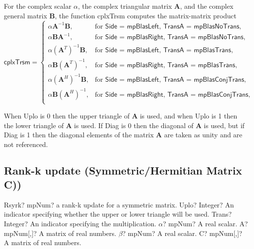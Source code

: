 \vspace{0.3cm}
For the complex scalar $\alpha$, the complex triangular matrix $\boldsymbol{A}$, and  the complex general matrix $\boldsymbol{B}$, the function \textsf{cplxTrsm} computes the matrix-matrix product
\begin{equation}
\textsf{cplxTrsm}=\begin{cases}
\alpha \boldsymbol{A}^{-1} \boldsymbol{B}, & \text{for } \textsf{Side = mpBlasLeft, TransA = mpBlasNoTrans},\\
\alpha \boldsymbol{B} \boldsymbol{A}^{-1}, & \text{for } \textsf{Side = mpBlasRight, TransA = mpBlasNoTrans},\\
\alpha \left(\boldsymbol{A}^T \right)^{-1} \boldsymbol{B}, & \text{for } \textsf{Side = mpBlasLeft, TransA = mpBlasTrans},\\
\alpha \boldsymbol{B} \left(\boldsymbol{A}^T \right)^{-1}, & \text{for } \textsf{Side = mpBlasRight, TransA = mpBlasTrans},\\
\alpha \left(\boldsymbol{A}^H \right)^{-1} \boldsymbol{B}, & \text{for } \textsf{Side = mpBlasLeft, TransA = mpBlasConjTrans},\\
\alpha \boldsymbol{B} \left(\boldsymbol{A}^H \right)^{-1}, & \text{for } \textsf{Side = mpBlasRight, TransA = mpBlasConjTrans},\\
\end{cases}
\end{equation}

When \textsf{Uplo} is 0 then the upper triangle of $\boldsymbol{A}$ is used, and when \textsf{Uplo} is 1 then the lower triangle of $\boldsymbol{A}$ is used. If \textsf{Diag} is 0 then the diagonal of $\boldsymbol{A}$ is used, but if \textsf{Diag} is 1 then the diagonal elements of the matrix $\boldsymbol{A}$ are taken as unity and are not referenced. 






\newpage
\subsection{Rank-k update (Symmetric/Hermitian Matrix C))}

\begin{mpFunctionsExtract}
	\mpFunctionSix
	{Rsyrk? mpNum? a rank-k update for a symmetric matrix.}
	{Uplo? Integer? An indicator specifying whether the upper or lower triangle will be used.}
	{Trans? Integer? An indicator specifying the multiplication.}
	{$\alpha$? mpNum? A real scalar.}
	{A? mpNum[,]? A matrix of real numbers.}
	{$\beta$? mpNum? A real scalar.}
	{C? mpNum[,]? A matrix of real numbers.}
\end{mpFunctionsExtract}

